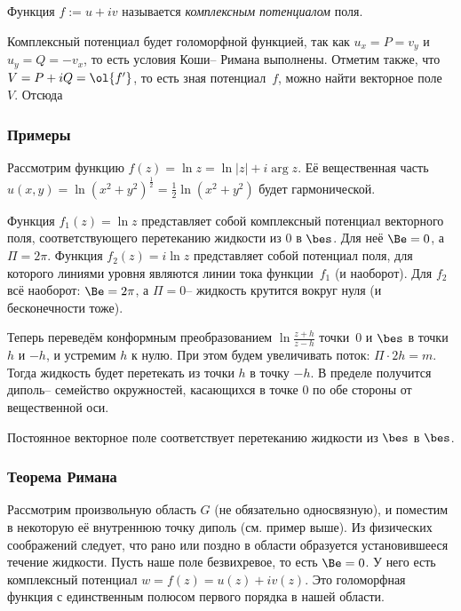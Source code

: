 \documentclass[a4paper]{article}
\begin{document}
\begin{df}
Функция $f := u + iv$ называется \emph{комплексным потенциалом} поля.
\end{df}

Комплексный потенциал будет голоморфной функцией, так как $u_x = P = v_y$ и $u_y = Q = -v_x$,
то есть условия Коши-- Римана выполнены. Отметим также, что $V = P+iQ = \ol{f'}$, то есть
зная потенциал~$f$, можно найти векторное поле~$V$. Отсюда

\subsubsection{Примеры}

\begin{nums}{-2}
\item Рассмотрим функцию $f(z) = \ln z = \ln |z| + i \arg z$. Её вещественная часть
      $u(x,y)=\ln (x^2+y^2)^{\frac12} = \frac12\ln (x^2+y^2)$ будет гармонической.
\item Функция $f_1(z) = \ln z$ представляет собой комплексный потенциал
      векторного поля, соответствующего перетеканию жидкости из $0$ в $\bes$. Для
      неё $\Be = 0$, а $\Pi = 2\pi$. Функция $f_2(z) = i\ln z$ представляет собой
      потенциал поля, для которого линиями уровня являются линии тока функции~$f_1$
      (и наоборот). Для $f_2$ всё наоборот: $\Be=2\pi$, а $\Pi=0$-- жидкость
      крутится вокруг нуля (и бесконечности тоже).

      Теперь переведём конформным преобразованием $\ln \frac{z+h}{z-h}$ точки~$0$
      и $\bes$ в точки $h$ и $-h$, и устремим $h$ к нулю. При этом будем увеличивать
      поток: $\Pi \cdot 2h = m$. Тогда жидкость будет перетекать из точки $h$ в точку $-h$.
      В пределе получится диполь-- семейство окружностей, касающихся в точке $0$ по
      обе стороны от вещественной оси.
\item Постоянное векторное поле соответствует перетеканию жидкости из $\bes$ в $\bes$.
\end{nums}

\subsubsection{Теорема Римана}

Рассмотрим произвольную область $G$ (не обязательно односвязную), и поместим в некоторую
её внутреннюю точку диполь (см. пример выше). Из физических соображений следует, что рано
или поздно в области образуется установившееся течение жидкости. Пусть наше поле безвихревое,
то есть $\Be=0$. У него есть комплексный потенциал $w=f(z)=u(z)+iv(z)$. Это голоморфная
функция с единственным полюсом первого порядка в нашей области.
\end{document}
